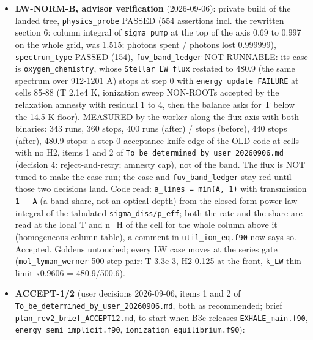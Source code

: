 \documentclass[english,a4paper]{my_memo}
\begin{document}
\begin{itemize}
  output files) and \texttt{mol\_base\_handoff} (7 files) BYTE-IDENTICAL before and
  after, Mdot 7.99 both; the retired copy had an \texttt{exp(-min(E/T,\ 700))}
  clamp whose only difference from the shared sum\textquotesingle s \texttt{exp(-E/T)} is below
  double rounding. No golden moves. The worker\textquotesingle s draft report stopped at
  "impact runs in progress"; this entry closes it.
\item
  \textbf{LW-NORM-B, advisor verification} (2026-09-06): private build of the
  landed tree, \texttt{physics\_probe} PASSED (554 assertions incl. the rewritten
  section 6: column integral of \texttt{sigma\_pump} at the top of the axis 0.69 to
  0.997 on the whole grid, was 1.515; photons spent / photons lost 0.999999),
  \texttt{spectrum\_type} PASSED (154), \texttt{fuv\_band\_ledger} NOT RUNNABLE: its case is
  \texttt{oxygen\_chemistry}, whose \texttt{Stellar\ LW\ flux} restated to 480.9 (the same
  spectrum over 912-1201 A) stops at step 0 with \texttt{energy\ update\ FAILURE} at
  cells 85-88 (T 2.1e4 K, ionization sweep NON-ROOTs accepted by the
  relaxation amnesty with residual 1 to 4, then the balance asks for T below
  the 14.5 K floor). MEASURED by the worker along the flux axis with both
  binaries: 343 runs, 360 stops, 400 runs (after) / stops (before), 440
  stops (after), 480.9 stops: a step-0 acceptance knife edge of the OLD code
  at cells with no H2, items 1 and 2 of \texttt{To\_be\_determined\_by\_user\_20260906.md}
  (decision 4: reject-and-retry; amnesty cap), not of the band. The flux is
  NOT tuned to make the case run; the case and \texttt{fuv\_band\_ledger} stay red
  until those two decisions land. Code read: \texttt{a\_lines\ =\ min(A,\ 1)} with
  transmission \texttt{1\ -\ A} (a band share, not an optical depth) from the
  closed-form power-law integral of the tabulated \texttt{sigma\_diss/p\_eff}; both
  the rate and the share are read at the local T and n\_H of the cell for the
  whole column above it (homogeneous-column table), a comment in
  \texttt{util\_ion\_eq.f90} now says so. Accepted. Goldens untouched; every LW case
  moves at the series gate (\texttt{mol\_lyman\_werner} 500-step pair: T 3.3e-3, H2
  0.125 at the front, \texttt{k\_LW} thin-limit x0.9606 = 480.9/500.6).
\item
  \textbf{ACCEPT-1/2} (user decisions 2026-09-06, items 1 and 2 of
  \texttt{To\_be\_determined\_by\_user\_20260906.md}, both as recommended; brief
  \texttt{plan\_rev2\_brief\_ACCEPT12.md}, to start when B3c releases
  \texttt{EXHALE\_main.f90}, \texttt{energy\_semi\_implicit.f90}, \texttt{ionization\_equilibrium.f90}):

\end{itemize}
\end{document}
